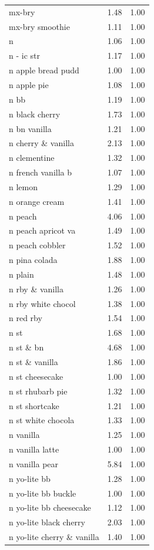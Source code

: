 \begin{table}
\begin{tabular}{lrr}
mx-bry & 1.48 & 1.00 \\
mx-bry smoothie & 1.11 & 1.00 \\
n & 1.06 & 1.00 \\
n - ic str & 1.17 & 1.00 \\
n apple bread pudd & 1.00 & 1.00 \\
n apple pie & 1.08 & 1.00 \\
n bb & 1.19 & 1.00 \\
n black cherry & 1.73 & 1.00 \\
n bn vanilla & 1.21 & 1.00 \\
n cherry \& vanilla & 2.13 & 1.00 \\
n clementine & 1.32 & 1.00 \\
n french vanilla b & 1.07 & 1.00 \\
n lemon & 1.29 & 1.00 \\
n orange cream & 1.41 & 1.00 \\
n peach & 4.06 & 1.00 \\
n peach apricot va & 1.49 & 1.00 \\
n peach cobbler & 1.52 & 1.00 \\
n pina colada & 1.88 & 1.00 \\
n plain & 1.48 & 1.00 \\
n rby \& vanilla & 1.26 & 1.00 \\
n rby white chocol & 1.38 & 1.00 \\
n red rby & 1.54 & 1.00 \\
n st & 1.68 & 1.00 \\
n st \& bn & 4.68 & 1.00 \\
n st \& vanilla & 1.86 & 1.00 \\
n st cheesecake & 1.00 & 1.00 \\
n st rhubarb pie & 1.32 & 1.00 \\
n st shortcake & 1.21 & 1.00 \\
n st white chocola & 1.33 & 1.00 \\
n vanilla & 1.25 & 1.00 \\
n vanilla latte & 1.00 & 1.00 \\
n vanilla pear & 5.84 & 1.00 \\
n yo-lite bb & 1.28 & 1.00 \\
n yo-lite bb buckle & 1.00 & 1.00 \\
n yo-lite bb cheesecake & 1.12 & 1.00 \\
n yo-lite black cherry & 2.03 & 1.00 \\
n yo-lite cherry \& vanilla & 1.40 & 1.00 \\

\end{tabular}
\end{table}
